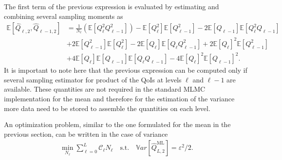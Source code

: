 The first term of the previous expression is evaluated by estimating and combining several sampling moments as
\begin{equation}
\begin{split}
 \mathbb{E}\left[ \hat{Q}_{\ell,2},\hat{Q}_{\ell-1,2} \right] &= \frac{1}{N_\ell} \left( \mathbb{E}\left[ Q_\ell^2 Q_{\ell-1}^2 \right] \right) - \mathbb{E}\left[ Q_\ell^2 \right] \mathbb{E}\left[Q_{\ell-1}^2 \right] - 2 \mathbb{E}\left[Q_{\ell-1} \right] \mathbb{E}\left[ Q_{\ell}^2 Q_{\ell-1} \right] \\
                                      &+ 2 \mathbb{E}\left[Q_{\ell-1}^2 \right] \mathbb{E}\left[ Q_{\ell}^2 \right]
                                      - 2  \mathbb{E}\left[ Q_{\ell} \right] \mathbb{E}\left[ Q_{\ell} Q_{\ell-1}^2 \right]
                                      + 2 \mathbb{E}\left[ Q_{\ell} \right]^2 \mathbb{E}\left[ Q_{\ell-1}^2 \right] \\
                                      &+ 4 \mathbb{E}\left[ Q_{\ell} \right] \mathbb{E}\left[ Q_{\ell-1} \right] \mathbb{E}\left[ Q_{\ell} Q_{\ell-1} \right]
                                      - 4 \mathbb{E}\left[ Q_{\ell} \right]^2 \mathbb{E}\left[ Q_{\ell-1} \right]^2.
\end{split}
\end{equation}
It is important to note here that the previous expression can be computed only if several sampling estimator for product of the QoIs at levels $\ell$ and $\ell-1$ are available.
These quantities are not required in the standard MLMC implementation for the mean and therefore for the estimation of the variance more data need to be stored to assemble the
quantities on each level.

An optimization problem, similar to the one formulated for the mean in the previous section, can be written in the case of variance 
\begin{equation}\label{EQ:mlmc_optimization_var}
\begin{split}
\min\limits_{N_\ell} \sum_{\ell=0}^L \mathcal{C}_{\ell} N_\ell \quad \mathrm{s.t.} \quad \mathbb{V}ar\left[ \hat{Q}_{L,2}^{\mathrm{ML}} \right] = \varepsilon^2/2.
% 
% 
\end{split}
\end{equation}

